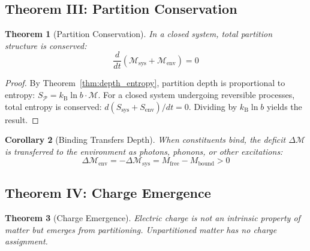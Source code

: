 \documentclass[twocolumn,10pt,a4paper]{article}
\theoremstyle{plain}
\newtheorem{theorem}{Theorem}[section]
\newtheorem{corollary}[theorem]{Corollary}
\theoremstyle{definition}
\theoremstyle{remark}
\newcommand{\kB}{k_{\mathrm{B}}}
\newcommand{\Depth}{\mathcal{M}}
\newcommand{\Mfree}{M_{\mathrm{free}}}
\newcommand{\Mbound}{M_{\mathrm{bound}}}
\newcommand{\Partition}{\mathcal{P}}
\begin{document}
\subsection{Theorem III: Partition Conservation}

\begin{theorem}[Partition Conservation]
\label{thm:conservation}
In a closed system, total partition structure is conserved:
\begin{equation}
    \frac{d}{dt}\!\left(\Depth_{\mathrm{sys}} + \Depth_{\mathrm{env}}\right) = 0
\end{equation}
\end{theorem}

\begin{proof}
By Theorem~\ref{thm:depth_entropy}, partition depth is proportional to entropy: $S_\Partition = \kB \ln b \cdot \Depth$. For a closed system undergoing reversible processes, total entropy is conserved: $d(S_{\mathrm{sys}} + S_{\mathrm{env}})/dt = 0$. Dividing by $\kB \ln b$ yields the result.
\end{proof}

\begin{corollary}[Binding Transfers Depth]
\label{cor:binding_transfer}
When constituents bind, the deficit $\Delta\Depth$ is transferred to the environment as photons, phonons, or other excitations:
\begin{equation}
    \Delta\Depth_{\mathrm{env}} = -\Delta\Depth_{\mathrm{sys}} = \Mfree - \Mbound > 0
\end{equation}
\end{corollary}

\subsection{Theorem IV: Charge Emergence}

\begin{theorem}[Charge Emergence]
\label{thm:charge_emergence}
Electric charge is not an intrinsic property of matter but emerges from partitioning. Unpartitioned matter has no charge assignment.
\end{theorem}
\end{document}
